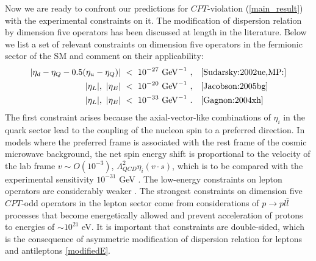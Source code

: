 \documentclass[12pt]{revtex4}
\begin{document}
	Now we are ready to confront our predictions for $CPT$-violation (\ref{main_result}) 
with the experimental constraints on it. The modification of dispersion relation by 
dimension five operators has been discussed at length in the literature. Below we 
list a set of relevant constraints on dimension five operators in the 
fermionic sector of the SM and comment on their applicability:
\begin{align}
\notag
	|\eta_d-\eta_Q - 0.5(\eta_u-\eta_Q)| &~<~ 10^{-27}~{\rm GeV}^{-1}~, && \cite{Sudarsky:2002ue,MP:}\\
\notag
	|\eta_L|,~|\eta_E| &~<~ 10^{-20}~{\rm GeV}^{-1}~,    && \cite{Jacobson:2005bg}\\
\notag
	|\eta_L|, ~|\eta_E| &~<~ 10^{-33}~{\rm GeV}^{-1}~.  && \cite{Gagnon:2004xh}
\end{align}
	The first constraint arises because the axial-vector-like combinations of $\eta_i$ in the quark sector 
	lead to the coupling of the nucleon spin to a preferred direction. In models where the 
	preferred frame is associated with the rest frame of the cosmic microwave background, the net spin energy shift 
is proportional to the velocity of the lab frame $v\sim O(10^{-3})$, $\Lambda_{QCD}^2\eta_i(v\cdot s)$, 
which is to be compared with 
the experimental sensitivity $10^{-31}$ GeV \cite{clock1,clock2}. The low-energy constraints on lepton 
operators are considerably weaker \cite{MP:}.
The strongest constraints on dimension five 
$CPT$-odd operators in the lepton sector come from considerations of $p\to p l\bar l$ processes that become 
energetically allowed and prevent acceleration of protons to energies of $\sim 10^{21}$ eV. It is important 
that constraints \cite{Gagnon:2004xh} are double-sided, which is the consequence of asymmetric modification 
of dispersion relation for leptons and antileptons \eqref{modifiedE}. 
\end{document}

